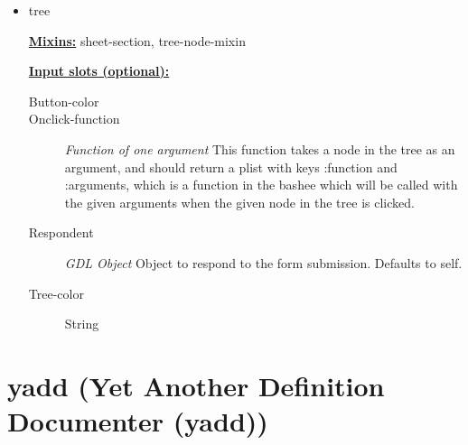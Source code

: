 \documentclass [11pt]{book}
\begin{document}
\begin{itemize}
\begin{description}
\end{description}







\item {}tree


\textbf{
\underline{Mixins:}} sheet-section, tree-node-mixin





\begin{description}

\end{description}








\textbf{
\underline{Input slots (optional):}}

\begin{description}

\item [Button-color]

\item [Onclick-function]
\emph{Function of one argument} This function takes a node in the tree as an argument, and should return
a plist with keys :function and :arguments, which is a function in the bashee which will be called
with the given arguments when the given node in the tree is clicked.


\item [Respondent]
\emph{GDL Object} Object to respond to the form submission. Defaults to self.


\item [Tree-color]
String


\end{description}







\end{itemize}





\section{yadd (Yet Another Definition Documenter (yadd))}

\label{sec:yadd(yetanotherdefinitiondocumenter(yadd))}
\end{document}
